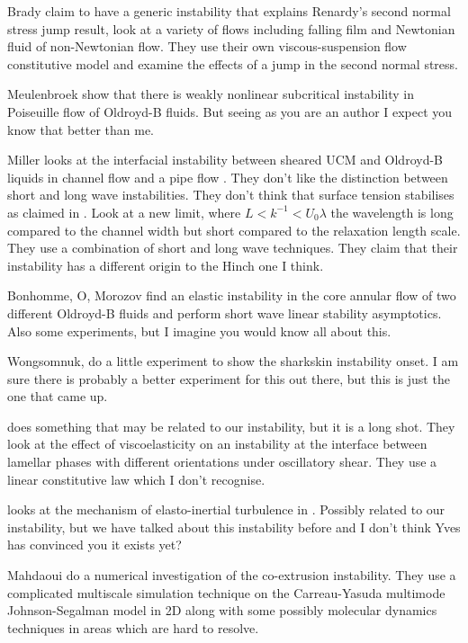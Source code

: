 \documentclass{jfm}
\begin{document}
Brady \citep{Brady2002} claim to have a generic instability that explains
Renardy's \citep{Renardy1999} second normal stress jump result, look at a
variety of flows including falling film and Newtonian fluid of non-Newtonian
flow. They use their own viscous-suspension flow constitutive model and
examine the effects of a jump in the second normal stress.

Meulenbroek \citep{Meulenbroek2004} show that there is weakly nonlinear
subcritical instability in Poiseuille flow of Oldroyd-B fluids. But seeing as
you are an author I expect you know that better than me.

Miller  looks at the interfacial instability between sheared UCM and Oldroyd-B
liquids in channel flow \citep{Miller2007a} and a pipe flow
\citep{Miller2007b}. They don't like the distinction between short and long
wave instabilities. They don't think that surface tension stabilises as claimed
in \citep{Chen1992b}. Look at a new limit, where $L < k^{-1} < U_{0} \lambda$
the wavelength is long compared to the channel width but short compared to the
relaxation length scale. They use a combination of short and long wave
techniques. They claim that their instability has a different origin to the
Hinch one I think.

Bonhomme, O, Morozov \citep{Bonhomme2011} find an elastic instability in the
core annular flow of two different Oldroyd-B fluids and perform short wave
linear stability asymptotics. Also some experiments, but I imagine you would
know all about this.

Wongsomnuk, \citep{Wongsomnuk2000} do a little experiment to show the sharkskin
instability onset. I am sure there is probably a better experiment for this out
there, but this is just the one that came up.

\citet{Yoo2013} does something that may be related to our instability, but
it is a long shot. They look at the effect of viscoelasticity on an instability
at the interface between lamellar phases with different orientations under
oscillatory shear.  They use a linear constitutive law which I don't recognise.

\citet{Dubief2013} looks at the mechanism of elasto-inertial
turbulence in \citet{Samanta2013}. Possibly related to our instability,
but we have talked about this instability before and I don't think Yves has
convinced you it exists yet?

Mahdaoui \citep{Mahdaoui2013} do a numerical investigation of the co-extrusion
instability. They use a complicated multiscale simulation technique on the
Carreau-Yasuda multimode Johnson-Segalman model in 2D along with some possibly
molecular dynamics techniques in areas which are hard to resolve.
\end{document}
